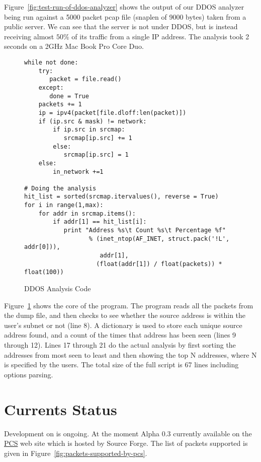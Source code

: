 \documentclass[11pt]{article}
\begin{document}
Figure~\ref{fig:test-run-of-ddos-analyzer} shows the output of our
DDOS analyzer being run against a 5000 packet pcap file (snaplen of
9000 bytes) taken from a public server.  We can see that the server is
not under DDOS, but is instead receiving almost $50\%$ of its traffic
from a single IP address.  The analysis took 2 seconds on a 2GHz Mac
Book Pro Core Duo.

\begin{figure}
  \centering
\begin{verbatim}
while not done:
    try:
       packet = file.read()
    except:
       done = True
    packets += 1
    ip = ipv4(packet[file.dloff:len(packet)])
    if (ip.src & mask) != network:
        if ip.src in srcmap:
           srcmap[ip.src] += 1
        else:
           srcmap[ip.src] = 1
    else:
        in_network +=1

# Doing the analysis
hit_list = sorted(srcmap.itervalues(), reverse = True)
for i in range(1,max):
    for addr in srcmap.items():
        if addr[1] == hit_list[i]:
           print "Address %s\t Count %s\t Percentage %f" 
                  % (inet_ntop(AF_INET, struct.pack('!L', addr[0])), 
                     addr[1], 
                    (float(addr[1]) / float(packets)) * float(100))

\end{verbatim}
  \caption{DDOS Analysis Code}
  \label{fig:ddos-analysis-code}
\end{figure}

Figure~\ref{fig:ddos-analysis-code} shows the core of the
 program.  The program reads all the packets
from the dump file, and then checks to see whether the source address
is within the user's subnet or not (line 8).  A dictionary is used to
store each unique source address found, and a count of the times that
address has been seen (lines 9 through 12).  Lines 17 through 21 do
the actual analysis by first sorting the addresses from most seen to
least and then showing the top N addresses, where N is specified by
the users.  The total size of the full script is 67 lines including
options parsing.

\section{Currents Status}
\label{sec:current-status}

Development on  is ongoing.  At the moment Alpha 0.3
currently available on the \href{http://pcs.sf.net}{PCS} web site
which is hosted by Source Forge.  The list of packets supported is
given in Figure~\ref{fig:packets-supported-by-pcs}.
\end{document}
